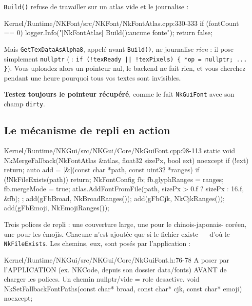 \begin{nkpiege}
\texttt{Build()} refuse de travailler sur un atlas vide et le journalise :

\begin{nkcode}{Kernel/Runtime/NKFont/src/NKFont/NkFontAtlas.cpp:330-333}
        if (fontCount == 0) {
            logger.Info("[NkFontAtlas] Build():aucune fonte\n");
            return false;
        }
\end{nkcode}

Mais \texttt{GetTexDataAsAlpha8}, appelé avant \texttt{Build()}, ne journalise
\emph{rien} : il pose simplement \texttt{nullptr}
( : \texttt{if (!texReady || !texPixels) \{ *op =
nullptr; ... \}}). Vous uploadez alors un pointeur nul, le backend ne fait rien,
et vous cherchez pendant une heure pourquoi tous vos textes sont invisibles.

\textbf{Testez toujours le pointeur récupéré}, comme le fait \texttt{NkGuiFont}
avec son champ \texttt{dirty}.
\end{nkpiege}

\subsection{Le mécanisme de repli en action}

\begin{nkcode}{Kernel/Runtime/NKGui/src/NKGui/Core/NkGuiFont.cpp:98-113}
        static void NkMergeFallback(NkFontAtlas &atlas, float32 sizePx, bool ext) noexcept {
            if (!ext)
                return;
            auto add = [&](const char *path, const uint32 *ranges) {
                if (!NkFileExists(path))
                    return;
                NkFontConfig fb;
                fb.glyphRanges = ranges;
                fb.mergeMode = true;
                atlas.AddFontFromFile(path, sizePx > 0.f ? sizePx : 16.f, &fb);
            };
            add(gFbBroad, NkBroadRanges());
            add(gFbCjk, NkCjkRanges());
            add(gFbEmoji, NkEmojiRanges());
        }
\end{nkcode}

Trois polices de repli : une couverture large, une pour le chinois-japonais-
coréen, une pour les émojis. Chacune n'est ajoutée que si le fichier existe —
d'où le \texttt{NkFileExists}. Les chemins, eux, sont posés par l'application :

\begin{nkcode}{Kernel/Runtime/NKGui/src/NKGui/Core/NkGuiFont.h:76-78}
 A poser par l'APPLICATION (ex. NKCode, depuis son dossier data/fonts) AVANT
 de charger les polices. Un chemin nullptr/vide = role desactive.
void NkSetFallbackFontPaths(const char* broad, const char* cjk, const char* emoji) noexcept;
\end{nkcode}

